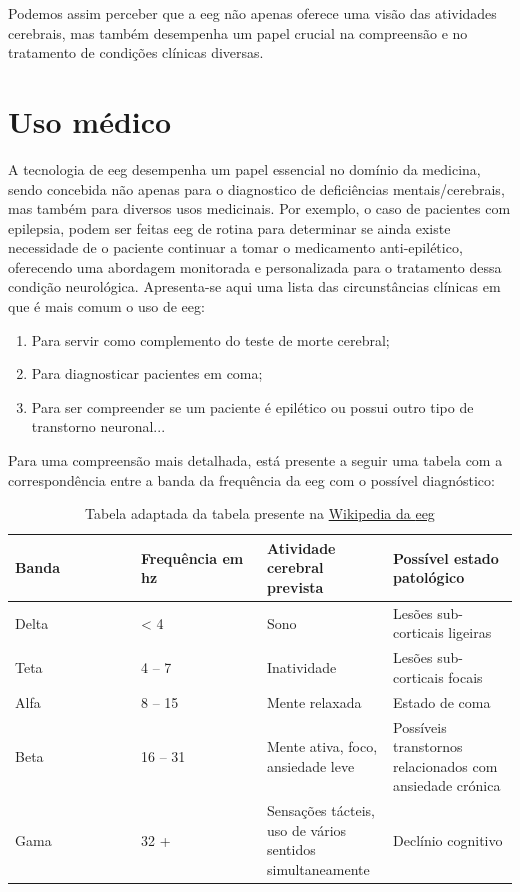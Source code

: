 \documentclass{report}
\begin{document}
Podemos assim perceber que a \ac{eeg} não apenas oferece uma visão das atividades cerebrais, mas também desempenha um papel crucial na compreensão e no tratamento de condições clínicas diversas. 
\section{Uso médico}
A tecnologia de \ac{eeg} desempenha um papel essencial no domínio da medicina, sendo concebida não apenas para o diagnostico de deficiências mentais/cerebrais, mas também para diversos usos medicinais. 
Por exemplo, o caso de pacientes com epilepsia, podem ser feitas \ac{eeg} de rotina para determinar se ainda existe necessidade de o paciente continuar a tomar o medicamento anti-epilético, oferecendo uma abordagem monitorada e personalizada para o tratamento dessa condição neurológica.
Apresenta-se aqui uma lista das circunstâncias clínicas em que é mais comum o uso de \ac{eeg}:
\begin{enumerate}
    \item Para servir como complemento do teste de morte cerebral;
    \item Para diagnosticar pacientes em coma;
    \item Para ser compreender se um paciente é epilético ou possui outro tipo de transtorno neuronal...
\end{enumerate}

Para uma compreensão mais detalhada, está presente a seguir uma tabela com a correspondência entre a banda da frequência da \ac{eeg} com o possível diagnóstico:
\clearpage
\begin{table}[htb]
    \centering  
    \begin{tabular}{|p{0.25\linewidth}|p{0.25\linewidth}|p{0.25\linewidth}|p{0.25\linewidth}|} 
        \hline
         Banda&  Frequência em \ac{hz}&  Atividade cerebral prevista& Possível estado patológico\\
         \hline
         Delta&  < 4 &  Sono& Lesões sub-corticais ligeiras\\
         \hline
         Teta&  4 – 7 &  Inatividade& Lesões sub-corticais focais\\
         \hline
         Alfa&  8 – 15 &  Mente relaxada& Estado de coma \\
         \hline
         Beta&  16 – 31 &  Mente ativa, foco, ansiedade leve& Possíveis transtornos relacionados com ansiedade crónica\\
         \hline
         Gama&  32 + &  Sensações tácteis, uso de vários sentidos simultaneamente& Declínio cognitivo\\
         \hline
    \end{tabular}
    \caption{Tabela adaptada da tabela presente na \href{https://pt.wikipedia.org/wiki/Eletroencefalografia}{Wikipedia da \ac{eeg}} }
    \label{tab:my_label}
\end{table}
\end{document}
